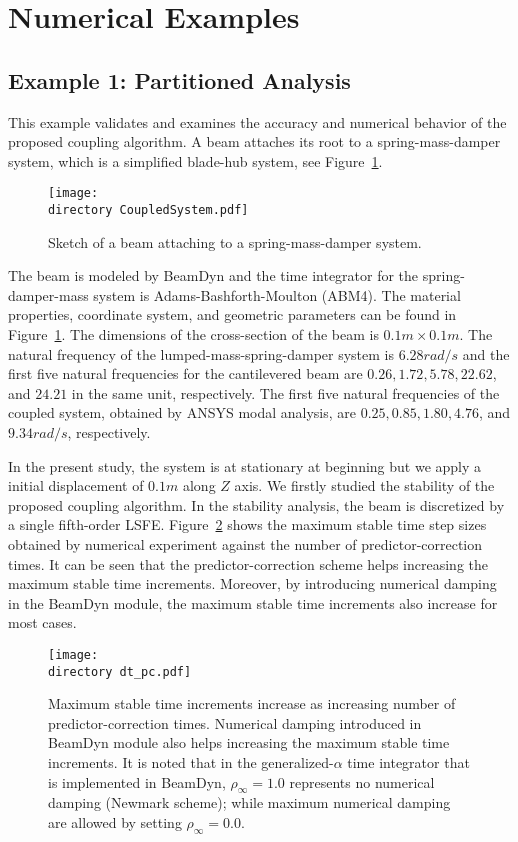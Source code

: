 \documentclass{aiaa-tc}
\def\directory{EPSF/}
\begin{document}
 
\section{Numerical Examples}
 
\subsection{Example 1: Partitioned Analysis}

 This example validates and examines the accuracy and numerical behavior of the proposed coupling algorithm. A beam attaches its root to a spring-mass-damper system, which is a simplified blade-hub system, see Figure~\ref{fig:CoupledSystem}. 
 \begin{figure}
\centering
\texttt{[image: \\directory CoupledSystem.pdf]}
\caption{Sketch of a beam attaching to a spring-mass-damper system.} 
\label{fig:CoupledSystem}
\end{figure}
 The beam is modeled by BeamDyn and the time integrator for the spring-damper-mass system is Adams-Bashforth-Moulton (ABM4). The material properties, coordinate system, and geometric parameters can be found in Figure~\ref{fig:CoupledSystem}. The dimensions of the cross-section of the beam is $0.1m \times 0.1m$. The natural frequency of the lumped-mass-spring-damper system is $6.28 rad/s$ and the first five natural frequencies for the cantilevered beam are $0.26, 1.72, 5.78, 22.62$, and $24.21$ in the same unit, respectively. The first five natural frequencies of the coupled system, obtained by ANSYS modal analysis, are $0.25, 0.85, 1.80, 4.76$, and $9.34 rad/s$, respectively.
 
 In the present study, the system is at stationary at beginning but we apply a initial displacement of $0.1m$ along $Z$ axis. We firstly studied the stability of the proposed coupling algorithm. In the stability analysis, the beam is discretized by a single fifth-order LSFE. Figure~\ref{fig:CoupledDTPC} shows the maximum stable time step sizes obtained by numerical experiment against the number of predictor-correction times. It can be seen that the predictor-correction scheme helps increasing the maximum stable time increments. Moreover, by introducing numerical damping in the BeamDyn module, the maximum stable time increments also increase for most cases.
 \begin{figure}
\centering
\texttt{[image: \\directory dt\_pc.pdf]}
\caption{Maximum stable time increments increase as increasing number of predictor-correction times. Numerical damping introduced in BeamDyn module also helps increasing the maximum stable time increments. It is noted that in the generalized-$\alpha$ time integrator that is implemented in BeamDyn, $\rho_\infty = 1.0$ represents no numerical damping (Newmark scheme); while maximum numerical damping are allowed by setting $\rho_\infty = 0.0$. } 
\label{fig:CoupledDTPC}
\end{figure}
 
\end{document}
